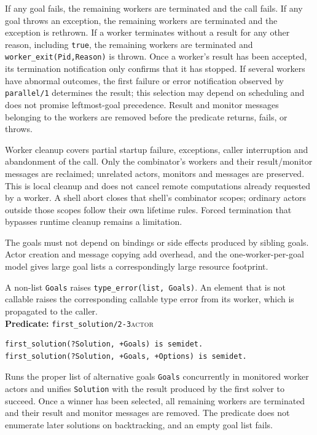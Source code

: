 If any goal fails, the remaining workers are terminated and the call fails.
If any goal throws an exception, the remaining workers are terminated and
the exception is rethrown. If a worker terminates without a result for any
other reason, including \texttt{true}, the remaining workers are terminated
and \texttt{worker\_\allowbreak{}exit(\allowbreak{}Pid,\allowbreak{}Reason)} is thrown. Once a worker's result has
been accepted, its termination notification only confirms that it has stopped.
If several workers have abnormal outcomes, the
first failure or error notification observed by \texttt{parallel/\allowbreak{}1}
determines the result; this selection may depend on scheduling and does not
promise leftmost-goal precedence. Result and monitor messages belonging to the
workers are removed before the predicate returns, fails, or throws.

Worker cleanup covers partial startup failure, exceptions, caller interruption and abandonment of
the call. Only the combinator's workers and their result/monitor messages are reclaimed; unrelated
actors, monitors and messages are preserved. This is local cleanup and does not cancel remote
computations already requested by a worker. A shell abort closes that shell's combinator scopes;
ordinary actors outside those scopes follow their own lifetime rules. Forced termination that bypasses runtime
cleanup remains a limitation.

The goals must not depend on bindings or side effects produced by sibling
goals. Actor creation and message copying add overhead, and the
one-worker-per-goal model gives large goal lists a correspondingly large
resource footprint.

A non-list \texttt{Goals} raises \texttt{type\_\allowbreak{}error(\allowbreak{}list,\allowbreak{} Goals)}. An
element that is not callable raises the corresponding callable type error
from its worker, which is propagated to the caller.\\

\noindent \textbf{Predicate:} \texttt{first\_\allowbreak{}solution/\allowbreak{}2-3}\hfill\textsc{actor}

\begin{verbatim}
first_solution(?Solution, +Goals) is semidet.
first_solution(?Solution, +Goals, +Options) is semidet.
\end{verbatim}

\noindent Runs the proper list of alternative goals \texttt{Goals}
concurrently in monitored worker actors and unifies \texttt{Solution} with
the result produced by the first solver to succeed. Once a winner has been
selected, all remaining workers are terminated and their result and monitor
messages are removed. The predicate does not enumerate later solutions on
backtracking, and an empty goal list fails.

